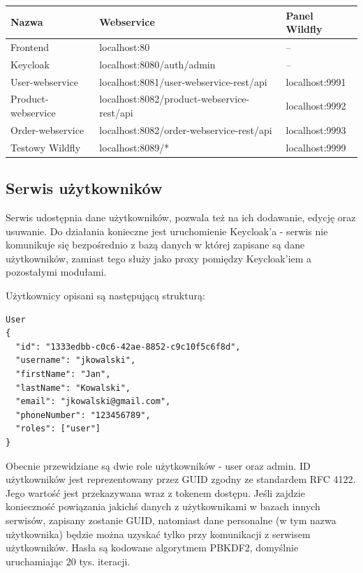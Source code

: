\documentclass[11pt,a4paper,twoside]{article}
\begin{document}
\begin{table}[ht]
\label{spisSerwisow}
\centering
\begin{tabular}{|l|l|l|}
\hline
 Nazwa & Webservice & Panel Wildfly \\\hline
 Frontend & localhost:80 & -- \\\hline
 Keycloak & localhost:8080/auth/admin & -- \\\hline
 User-webservice & localhost:8081/user-webservice-rest/api & localhost:9991 \\\hline
 Product-webservice & localhost:8082/product-webservice-rest/api & localhost:9992 \\\hline
 Order-webservice & localhost:8082/order-webservice-rest/api & localhost:9993\\\hline
 Testowy Wildfly & localhost:8089/* & localhost:9999 \\\hline
\end{tabular}
\end{table}

\subsection{Serwis użytkowników}
Serwis udostępnia dane użytkowników, pozwala też na ich dodawanie, edycję oraz usuwanie. Do działania konieczne jest uruchomienie Keycloak'a  - serwis nie komunikuje się bezpośrednio z bazą danych w której zapisane są dane użytkowników, zamiast tego służy jako proxy pomiędzy Keycloak'iem a pozostałymi modułami.

Użytkownicy opisani są następującą strukturą:

\begin{lstlisting}
User
{
  "id": "1333edbb-c0c6-42ae-8852-c9c10f5c6f8d",
  "username": "jkowalski",
  "firstName": "Jan",
  "lastName": "Kowalski",
  "email": "jkowalski@gmail.com",
  "phoneNumber": "123456789",
  "roles": ["user"]
}
\end{lstlisting}
\vspace{-20pt}
Obecnie przewidziane są dwie role użytkowników - user oraz admin. ID użytkowników jest reprezentowany przez GUID zgodny ze standardem RFC 4122. Jego wartość jest przekazywana wraz z tokenem dostępu. Jeśli zajdzie konieczność powiązania jakichś danych z użytkownikami w bazach innych serwisów, zapisany zostanie GUID, natomiast dane personalne (w tym nazwa użytkownika) będzie można uzyskać tylko przy komunikacji z serwisem użytkowników. Hasła są kodowane algorytmem PBKDF2, domyślnie uruchamiając 20 tys. iteracji.
\end{document}
